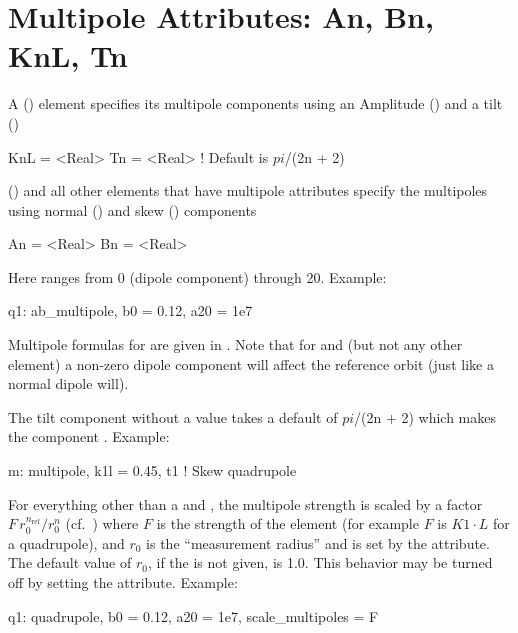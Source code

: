 \section{Multipole Attributes: An, Bn, KnL, Tn}
\label{s:multip}

A  () element specifies its multipole
components using an Amplitude () and a tilt ()
\begin{example}
  KnL = <Real>
  Tn  = <Real>  ! Default is $pi$/(2n + 2)
\end{example}
 () and all other elements that
have multipole attributes specify the multipoles using normal
() and skew () components 
\begin{example}
  An = <Real>
  Bn = <Real>
\end{example}
Here  ranges from 0
(dipole component) through 20. Example:
\begin{example}
  q1: ab_multipole, b0 = 0.12, a20 = 1e7
\end{example}

Multipole formulas for are given in .  Note that for
 and  (but not any other element) a
non-zero dipole component will affect the reference orbit (just like a
normal dipole will).

The  tilt component without a value takes a default of $pi$/(2n
+ 2) which makes the component .  Example:
\begin{example}
  m: multipole, k1l = 0.45, t1  ! Skew quadrupole
\end{example}

For everything other than a  and , the
multipole strength is scaled by a factor $F \, r_0^{n_\text{ref}} /
r_0^n$ (cf.~) where $F$ is the strength of the element (for
example $F$ is $K1 \cdot L$ for a quadrupole), and $r_0$ is the
``measurement radius'' and is set by the  attribute. The
default value of $r_0$, if the  is not given, is 1.0.  This
behavior may be turned off by setting the 
attribute.  Example:
\begin{example}
  q1: quadrupole, b0 = 0.12, a20 = 1e7, scale_multipoles = F
\end{example}

